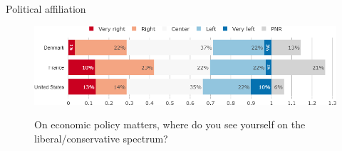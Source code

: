 \documentclass[aspectratio=169,9pt,dvipsnames]{beamer}
\begin{document}

\begin{frame}{Political affiliation}%
\begin{figure}[h!]
\centering
\caption{On economic policy matters, where do you see yourself on the liberal/conservative spectrum?}
\includegraphics[width=\textwidth]{../figures/country_comparison/left_right_countries.png} \\
\end{figure}
\end{frame}
\end{document}
